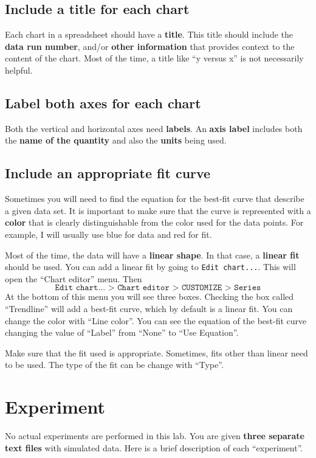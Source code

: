 \subsection{Include a title for each chart}
%
Each chart in a spreadsheet should have a \textbf{title}. This title should include the \textbf{data run number}, and/or \textbf{other information} that provides context to the content of the chart. Most of the time, a title like ``y versus x'' is not necessarily helpful.
%
\subsection{Label both axes for each chart}
%
Both the vertical and horizontal axes need \textbf{labels}. An \textbf{axis label} includes both the \textbf{name of the quantity} and also the \textbf{units} being used.
%
\subsection{Include an appropriate fit curve}
%
Sometimes you will need to find the equation for the best-fit curve that describe a given data set. It is important to make sure that the curve is represented with a \textbf{color} that is clearly distinguishable from the color used for the data points. For example, I will usually use blue for data and red for fit.

Most of the time, the data will have a \textbf{linear shape}. In that case, a \textbf{linear fit} should be used. You can add a linear fit by going to \texttt{Edit chart...}. This will open the ``Chart editor'' menu. Then
\begin{equation}
    \texttt{Edit chart... > Chart editor > CUSTOMIZE > Series}
\end{equation}
At the bottom of this menu you will see three boxes. Checking the box called ``Trendline'' will add a best-fit curve, which by default is a linear fit. You can change the color with ``Line color''. You can see the equation of the best-fit curve changing the value of ``Label'' from ``None'' to ``Use Equation''.

Make sure that the fit used is appropriate. Sometimes, fits other than linear need to be used. The type of the fit can be change with ``Type''.
%
\section{Experiment}
%
No actual experiments are performed in this lab. You are given \textbf{three separate text files} with simulated data. Here is a brief description of each ``experiment''.
%
